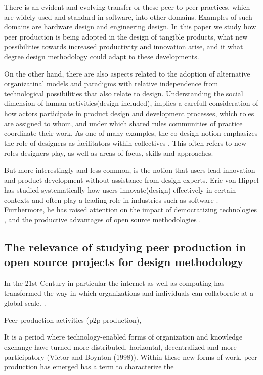 \documentclass{ICED-Paper}%
\begin{document}
There is an evident and evolving transfer or these peer to peer practices, which are widely used and standard in software, into other domains. Examples of such domains are hardware design and engineering design. In this paper we study how peer production is being adopted in the design of tangible products, what new possibilities towards increased productivity and innovation arise, and it what degree design methodology could adapt to these developments.


On the other hand, there are also aspects related to the adoption of alternative organizatinal models and paradigms with relative independence from technological possibilities that also relate to design. Understanding the social dimension of human activities(design included), implies  a carefull consideration of how actors participate in product design and development processes, which roles are assigned to whom, and under which shared rules communities of practice coordinate their work.
As one of many examples, the co-design notion emphasizes the role of designers as facilitators within collectives \cite{Codesign}. This often refers to new roles designers play, as well as areas of focus, skills and approaches.

But more interestingly and less common, is the notion that users lead innovation and product development without assistance from design experts. Eric von Hippel has studied systematically how users innovate(design) effectively in certain contexts\cite{hippel_1} and often play a leading role in industries such as software \cite{OpenSource}. Furthermore, he has raised attention on the impact of democratizing technologies \cite{hippel_2}, and the productive advantages of open source methodologies \cite{}.




\subsection{The relevance of studying peer production in open source projects for design methodology}
In the 21st Century in particular the internet as well as computing has transformed the way in which organizations and individuals can collaborate at a global scale.  \cite{}.

Peer production activities (p2p production),


It is a period where technology-enabled forms of organization and knowledge exchange have turned more distributed, horizontal, decentralized and more participatory (Victor and Boynton (1998)). Within these new forms of work, peer production has emerged has a term to characterize the
\end{document}
